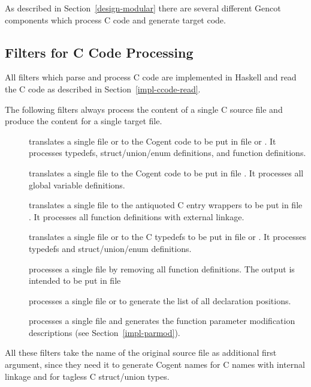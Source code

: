 As described in Section~\ref{design-modular} there are several different Gencot components which process C code and generate 
target code.

\subsection{Filters for C Code Processing}
\label{impl-ccomps-filters}

All filters which parse and process C code are implemented in Haskell and read the
C code as described in Section~\ref{impl-ccode-read}.

The following filters always process the content of a single C source file and produce the content for a single 
target file.
\begin{description}
\item[] translates a single file  or  to the Cogent code to be put in file
 or . It processes typedefs, struct/union/enum definitions, and function
definitions. 
\item[] translates a single file  to the Cogent code to be put in file .
It processes all global variable definitions.
\item[] translates a single file  to the antiquoted C entry wrappers to be put in
file . It processes all function definitions with external linkage.
\item[] translates a single file  or  to the C typedefs to be put in
file  or . It processes typedefs and struct/union/enum definitions.
\item[] processes a single file  by removing all function definitions. The output
is intended to be put in file 
\item[] processes a single file  or  to generate the list of
all declaration positions.
\item[] processes a single file  and generates the 
function parameter modification descriptions (see Section~\ref{impl-parmod}).
\end{description}

All these filters take the name of the original source file as additional first
argument, since they need it to generate Cogent names for C names with internal linkage and for tagless C struct/union
types.

